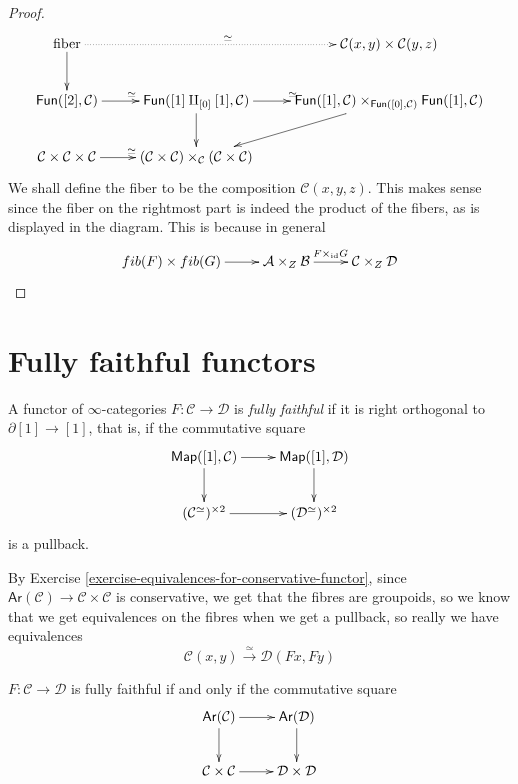 \begin{proof}
$$
\xymatrix{
\text{fiber}\ar[d]\ar@{.>}[rr]^{\simeq}&&
\mathcal{C}(x,y)\times \mathcal{C}(y,z)\\
\mathsf{Fun}([2],\mathcal{C})\ar[r]^{\simeq}&
\mathsf{Fun}([1]\amalg_{[0]}[1],\mathcal{C})\ar[r]^{\simeq}\ar[d]
&\mathsf{Fun}([1],\mathcal{C})\times_{\mathsf{Fun}([0],\mathcal{C})}
\mathsf{Fun}([1],\mathcal{C})\ar[ld]\\
\mathcal{C}\times\mathcal{C}\times\mathcal{C}\ar[r]^{\simeq}&
(\mathcal{C} \times \mathcal{C})
\times_{\mathcal{C}}(\mathcal{C}\times\mathcal{C})
}
$$
We shall define the fiber to be the
composition $\mathcal{C}(x,y,z)$.
This makes sense since
the fiber on the rightmost part
is indeed the product of the fibers, 
as is displayed in the diagram.
This is because in general
$$
\xymatrix{
fib(F)\times fib(G)\ar[r]&  \mathcal{A}\times_Z \mathcal{B}
\ar[r]^{F\times_{\text{id}}G}&
\mathcal{C}\times_Z \mathcal{D}
}
$$
\end{proof}


\section{Fully faithful functors}
\label{section-fully-faithful-functors}

\begin{definition}
\label{definition-fully-faithful}
A functor of $\infty$-categories $F:\mathcal{C} \to \mathcal{D}$ 
is {\it fully faithful} if it is
right orthogonal to $\partial[1] \to [1]$,
that is, if the commutative square
$$
\xymatrix{
\mathsf{Map}([1],\mathcal{C})\ar[r]\ar[d]&
\mathsf{Map}([1],\mathcal{D})\ar[d]\\
(\mathcal{C}^\simeq)^{\times 2}\ar[r]&
(\mathcal{D}^\simeq)^{\times 2}
}
$$
is a pullback.
\end{definition}

By Exercise \ref{exercise-equivalences-for-conservative-functor}, since 
$\mathsf{Ar}(\mathcal{C})\to \mathcal{C}\times\mathcal{C}$
is conservative, we get that the fibres
are groupoids, so we know that we get equivalences
on the fibres when we get a pullback, so really we have
equivalences
$$
\mathcal{C}(x,y)\xrightarrow{\simeq}\mathcal{D}(Fx,Fy)
$$
\begin{proposition}
\label{proposition-fullt-faithfull-iff-pullback}
$F:\mathcal{C} \to \mathcal{D}$ is fully faithful
if and only if the commutative square
$$
\xymatrix{
\mathsf{Ar}(\mathcal{C})\ar[r]\ar[d]&\mathsf{Ar}(\mathcal{D})\ar[d]\\
\mathcal{C}\times\mathcal{C}\ar[r]&\mathcal{D}\times\mathcal{D}
}
$$
\end{proposition}

